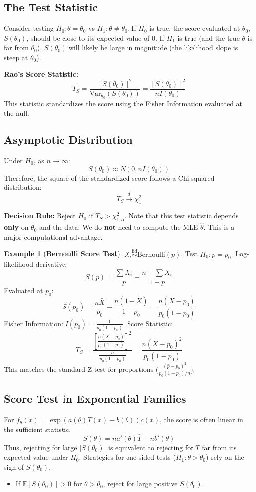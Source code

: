 \documentclass[12pt, a4paper]{article}
\theoremstyle{definition}
\newtheorem{example}{Example}
\newcommand{\E}{\mathbb{E}}
\newcommand{\Var}{\text{Var}}
\newcommand{\iid}{\overset{\text{iid}}{\sim}}
\begin{document}
\subsection{The Test Statistic}
Consider testing $H_0: \theta = \theta_0$ vs $H_1: \theta \neq \theta_0$.
If $H_0$ is true, the score evaluated at $\theta_0$, $S(\theta_0)$, should be close to its expected value of 0.
If $H_1$ is true (and the true $\theta$ is far from $\theta_0$), $S(\theta_0)$ will likely be large in magnitude (the likelihood slope is steep at $\theta_0$).

\textbf{Rao's Score Statistic:}
$$ T_S = \frac{[S(\theta_0)]^2}{\Var_{\theta_0}(S(\theta_0))} = \frac{[S(\theta_0)]^2}{n I(\theta_0)} $$
This statistic standardizes the score using the Fisher Information evaluated at the null.

\subsection{Asymptotic Distribution}
Under $H_0$, as $n \to \infty$:
$$ S(\theta_0) \approx N(0, n I(\theta_0)) $$
Therefore, the square of the standardized score follows a Chi-squared distribution:
$$ T_S \xrightarrow{d} \chi^2_1 $$

\textbf{Decision Rule:}
Reject $H_0$ if $T_S > \chi^2_{1, \alpha}$.
Note that this test statistic depends \textbf{only} on $\theta_0$ and the data. We do \textbf{not} need to compute the MLE $\hat{\theta}$. This is a major computational advantage.

\begin{example}[\textbf{Bernoulli Score Test}]
$X_i \iid \text{Bernoulli}(p)$. Test $H_0: p = p_0$.
Log-likelihood derivative:
$$ S(p) = \frac{\sum X_i}{p} - \frac{n - \sum X_i}{1-p} $$
Evaluated at $p_0$:
$$ S(p_0) = \frac{n \bar{X}}{p_0} - \frac{n(1-\bar{X})}{1-p_0} = \frac{n(\bar{X} - p_0)}{p_0(1-p_0)} $$
Fisher Information: $I(p_0) = \frac{1}{p_0(1-p_0)}$.
Score Statistic:
$$ T_S = \frac{\left[ \frac{n(\bar{X} - p_0)}{p_0(1-p_0)} \right]^2}{\frac{n}{p_0(1-p_0)}} = \frac{n (\bar{X} - p_0)^2}{p_0(1-p_0)} $$
This matches the standard Z-test for proportions ($\frac{(\hat{p}-p_0)^2}{p_0(1-p_0)/n}$).
\end{example}

\subsection{Score Test in Exponential Families}
For $f_\theta(x) = \exp(a(\theta)T(x) - b(\theta))c(x)$, the score is often linear in the sufficient statistic.
$$ S(\theta) = n a'(\theta) \bar{T} - n b'(\theta) $$
Thus, rejecting for large $|S(\theta_0)|$ is equivalent to rejecting for $\bar{T}$ far from its expected value under $H_0$.
Strategies for one-sided tests ($H_1: \theta > \theta_0$) rely on the sign of $S(\theta_0)$.
\begin{itemize}
    \item If $\E[S(\theta_0)] > 0$ for $\theta > \theta_0$, reject for large positive $S(\theta_0)$.
\end{itemize}
\end{document}

